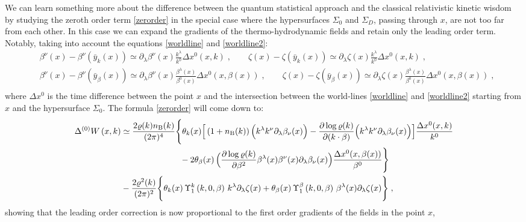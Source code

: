 \documentclass[prd,superscriptaddress,nofootinbib,notitlepage]{revtex4-1}
\begin{document}
We can learn something more about the difference between the quantum statistical approach and the classical relativistic kinetic
wisdom by studying the zeroth order term \eqref{zerorder} in the special case where the hypersurfaces $\Sigma_0$ and $\Sigma_D$,
passing through $x$, are not too far from each other. In this case we can expand the gradients of the thermo-hydrodynamic fields
and retain only the leading order term. Notably, taking into account the equations \eqref{worldline} and \eqref{worldline2}:
%
\begin{align*}
 & \beta^\nu(x) - \beta^\nu(\bar y_k(x)) \simeq \partial_\lambda \beta^\nu(x) \frac{k^\lambda}{k^0} \Delta x^0(x,k)\;,
 \qquad \zeta(x) - \zeta(\bar y_k(x)) \simeq \partial_\lambda \zeta(x) \frac{k^\lambda}{k^0} \Delta x^0(x,k)\;, \\
 & \beta^\nu(x) - \beta^\nu(\bar y_\beta(x)) \simeq \partial_\lambda \beta^\nu(x) \frac{\beta^\lambda(x)}{\beta^0(x)} 
 \Delta x^0(x,\beta(x))\;,
 \qquad \zeta(x) - \zeta(\bar y_\beta(x)) \simeq \partial_\lambda \zeta(x) \frac{\beta^\lambda(x)}{\beta^0(x)} \Delta x^0(x,\beta(x))\;,\\
\end{align*}
%
where $\Delta x^0$ is the time difference between the point $x$ and the intersection between the world-lines \eqref{worldline} 
and \eqref{worldline2} starting from $x$ and the hypersurface $\Sigma_0$. The formula \eqref{zerorder} will come down to:
%
\begin{align}\label{leadorder}
\Delta^{(0)}W\left(x,k\right) &\simeq \frac{2\varrho(k)n_{\rm B}(k)}{(2\pi)^4} \Bigg\{ \theta_k(x) \Big[
\left(1+n_{\rm B}(k)\right)\Big( k^\lambda k^\nu \partial_\lambda \beta_\nu (x) \Big)
-\frac{\partial\log\varrho(k)}{\partial(k \cdot \beta)}\Big( k^\lambda k^\nu \partial_\lambda \beta_\nu (x) \Big)
\Big]  \frac{\Delta x^0(x,k)}{k^0} \nonumber \\
&\qquad\qquad\qquad\quad-2 \theta_\beta(x) \,\Big( \frac{\partial\log\varrho(k)}{\partial\beta^2}
\beta^\lambda(x)\beta^\nu(x)\partial_\lambda \beta_\nu(x) \Big) \frac{\Delta x^0(x,\beta(x))}{\beta^0} \Bigg\}\\
&-\frac{2\varrho^2(k)}{(2\pi)^2}\Bigg\{\theta_k(x)\,\Upsilon^k_1\left(k,0,\beta\right)\,k^\lambda
\partial_\lambda\zeta(x)+\theta_\beta(x)\,
\Upsilon^\beta_1\left(k,0,\beta\right)\,\beta^\lambda(x)\partial_\lambda\zeta(x)\Bigg\}\;,\nonumber
\end{align}
%
showing that the leading order correction is now proportional to the first order gradients of the fields in the point $x$,
\end{document}

